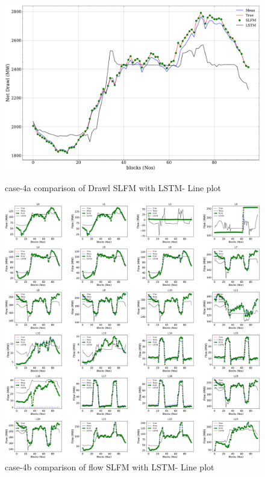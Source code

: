 \documentclass[conference]{IEEEtran}
\begin{document}
\begin{figure}[!ht]
\includegraphics[width=1\linewidth]{Test_results_full5.pdf}
\caption{case-4a comparison of Drawl SLFM with LSTM- Line plot}
\label{case4a}
\includegraphics[width=1\linewidth]{Test_results2.pdf}
\caption{case-4b comparison of flow SLFM with LSTM- Line plot}
\label{case4b}
\end{figure}
\end{document}
